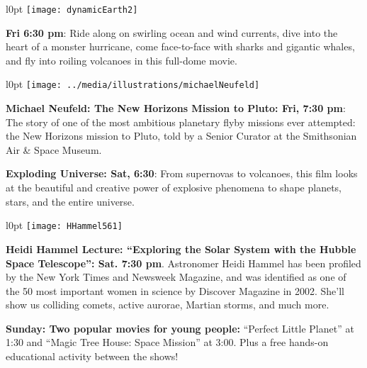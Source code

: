 \documentclass{article}
\begin{document}
   {\fontsize{19}{19}

     \begin{wrapfigure}[5]{l}{0pt}
       \texttt{[image: dynamicEarth2]}
     \end{wrapfigure}      
     
      \textbf{Fri  6:30 pm}: Ride along on swirling ocean and wind currents, dive into the heart of a monster hurricane, come face-to-face with sharks and gigantic whales, and fly into roiling volcanoes in this full-dome movie.


   \begin{wrapfigure}[6]{l}{0pt}
      \texttt{[image: ../media/illustrations/michaelNeufeld]}
   \end{wrapfigure}      
   
   \textbf{Michael Neufeld: The New Horizons Mission to Pluto: Fri, 7:30 pm}: 
      The story of one of the most ambitious planetary flyby missions ever attempted: the New Horizons mission to Pluto,
      told by a Senior Curator at the Smithsonian Air \& Space Museum.
      




     \textbf{Exploding Universe: Sat, 6:30}: From supernovas to volcanoes, this film looks at the beautiful and creative power of explosive phenomena to shape planets, stars, and the entire universe.



 \begin{wrapfigure}[6]{l}{0pt}
   \texttt{[image: HHammel561]}
 \end{wrapfigure}      

   \textbf{Heidi Hammel Lecture: “Exploring the Solar System with the Hubble Space Telescope”: Sat. 7:30 pm}. 
Astronomer Heidi Hammel has been profiled by the New York Times and Newsweek Magazine, and was identified as one of the 50 most important women in science by Discover Magazine in 2002. She’ll show us colliding comets, active aurorae, Martian storms, and much more.


\textbf{Sunday: Two popular movies for young people:} “Perfect Little Planet” at 1:30 and “Magic Tree House: 
Space Mission” at 3:00. Plus a free hands-on educational activity between the shows!

}
\end{document}
